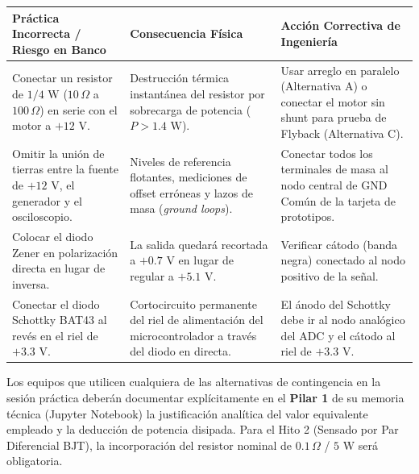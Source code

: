 \documentclass[11pt, a4paper]{article}
\begin{document}
\begin{table}[h!]
\centering
\footnotesize
\renewcommand{\arraystretch}{1.5}
\begin{tabularx}{\textwidth}{@{} >{\raggedright\arraybackslash}X >{\raggedright\arraybackslash}X >{\raggedright\arraybackslash}X @{}}
\toprule
\textbf{Práctica Incorrecta / Riesgo en Banco} & \textbf{Consecuencia Física} & \textbf{Acción Correctiva de Ingeniería} \\
\midrule
Conectar un resistor de $1/4\text{ W}$ ($10\,\Omega$ a $100\,\Omega$) en serie con el motor a $+12\text{ V}$. & 
Destrucción térmica instantánea del resistor por sobrecarga de potencia ($P > 1.4\text{ W}$). & 
Usar arreglo en paralelo (Alternativa A) o conectar el motor sin shunt para prueba de Flyback (Alternativa C). \\

Omitir la unión de tierras entre la fuente de $+12\text{ V}$, el generador y el osciloscopio. & 
Niveles de referencia flotantes, mediciones de offset erróneas y lazos de masa (\textit{ground loops}). & 
Conectar todos los terminales de masa al nodo central de GND Común de la tarjeta de prototipos. \\

Colocar el diodo Zener en polarización directa en lugar de inversa. & 
La salida quedará recortada a $+0.7\text{ V}$ en lugar de regular a $+5.1\text{ V}$. & 
Verificar cátodo (banda negra) conectado al nodo positivo de la señal. \\

Conectar el diodo Schottky BAT43 al revés en el riel de $+3.3\text{ V}$. & 
Cortocircuito permanente del riel de alimentación del microcontrolador a través del diodo en directa. & 
El ánodo del Schottky debe ir al nodo analógico del ADC y el cátodo al riel de $+3.3\text{ V}$. \\
\bottomrule
\end{tabularx}
\end{table}

\vspace{0.4cm}
\begin{cajaevaluacion}
Los equipos que utilicen cualquiera de las alternativas de contingencia en la sesión práctica deberán documentar explícitamente en el \textbf{Pilar 1} de su memoria técnica (Jupyter Notebook) la justificación analítica del valor equivalente empleado y la deducción de potencia disipada. Para el Hito 2 (Sensado por Par Diferencial BJT), la incorporación del resistor nominal de $0.1\,\Omega$ / $5\text{ W}$ será obligatoria.
\end{cajaevaluacion}
\end{document}
